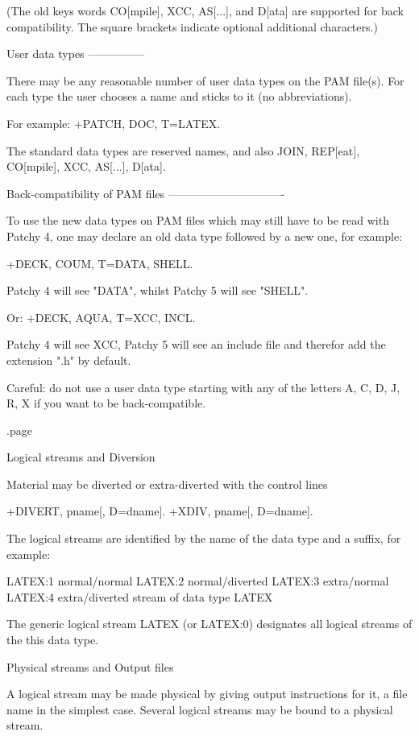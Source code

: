      (The old keys words CO[mpile], XCC, AS[...], and D[ata] are
      supported for back compatibility. The square brackets indicate
      optional additional characters.)

   User data types
   ---------------

   There may be any reasonable number of user data types on the PAM file(s).
   For each type the user chooses a name and sticks to it (no abbreviations).

   For example:  +PATCH, DOC, T=LATEX.

   The standard data types are reserved names, and also JOIN, REP[eat],
   CO[mpile], XCC, AS[...], D[ata].

   Back-compatibility of PAM files
   -------------------------------

   To use the new data types on PAM files which may still have to be read
   with Patchy 4, one may declare an old data type followed by a new one,
   for example:

          +DECK, COUM, T=DATA, SHELL.

   Patchy 4 will see "DATA", whilst Patchy 5 will see "SHELL".

   Or:
          +DECK, AQUA, T=XCC, INCL.

   Patchy 4 will see XCC, Patchy 5 will see an include file and therefor
   add the extension ".h" by default.

   Careful: do not use a user data type starting with any of the
   letters A, C, D, J, R, X if you want to be back-compatible.

.page
\item
Logical streams and Diversion

Material may be diverted or extra-diverted with the control lines

      +DIVERT, pname[, D=dname].
      +XDIV,   pname[, D=dname].

The logical streams are identified by the name of the data type
and a suffix, for example:

      LATEX:1   normal/normal
      LATEX:2   normal/diverted
      LATEX:3   extra/normal
      LATEX:4   extra/diverted    stream of data type LATEX

The generic logical stream LATEX (or LATEX:0) designates all
logical streams of the this data type.


\item
Physical streams and Output files

A logical stream may be made physical by giving output instructions for it,
a file name in the simplest case. Several logical streams may be bound to
a physical stream.

